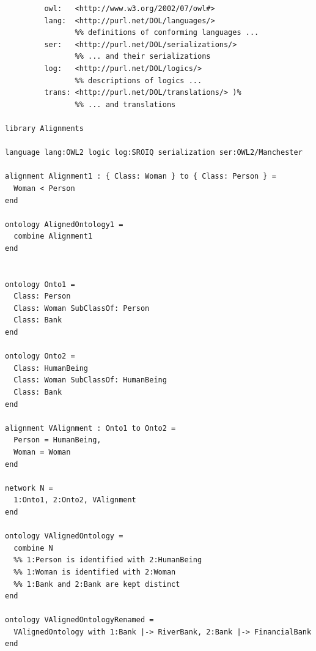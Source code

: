 \documentclass[10pt, a4paper]{isov2}
\begin{document}

\label{ex:alignment}
\begin{lstlisting}[basicstyle=\ttfamily,language=dolText,alsolanguage=OWL2manchester,escapechar=@,mathescape]
%prefix( :      <http://www.example.org/@alignment@#>
         owl:   <http://www.w3.org/2002/07/owl#>
         lang:  <http://purl.net/DOL/languages/>
                %% definitions of conforming languages ...
         ser:   <http://purl.net/DOL/serializations/>
                %% ... and their serializations
         log:   <http://purl.net/DOL/logics/>
                %% descriptions of logics ...
         trans: <http://purl.net/DOL/translations/> )%
                %% ... and translations

library Alignments

language lang:OWL2 logic log:SROIQ serialization ser:OWL2/Manchester

alignment Alignment1 : { Class: Woman } to { Class: Person } =
  Woman < Person
end

ontology AlignedOntology1 =
  combine Alignment1
end


ontology Onto1 =
  Class: Person
  Class: Woman SubClassOf: Person
  Class: Bank
end

ontology Onto2 =
  Class: HumanBeing
  Class: Woman SubClassOf: HumanBeing
  Class: Bank
end

alignment VAlignment : Onto1 to Onto2 =
  Person = HumanBeing,
  Woman = Woman
end

network N =
  1:Onto1, 2:Onto2, VAlignment
end

ontology VAlignedOntology =
  combine N
  %% 1:Person is identified with 2:HumanBeing
  %% 1:Woman is identified with 2:Woman
  %% 1:Bank and 2:Bank are kept distinct
end

ontology VAlignedOntologyRenamed =
  VAlignedOntology with 1:Bank |-> RiverBank, 2:Bank |-> FinancialBank
end

\end{lstlisting}


\end{document}
